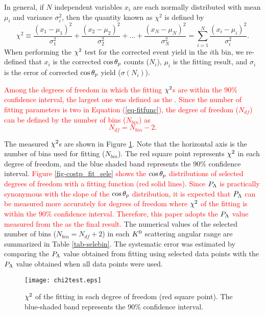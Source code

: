 In general, if $N$ independent variables $x_i$ are each normally distributed with mean $\mu_i$ and variance $\sigma_i^2$, then the quantity known as $\chi^2$ is defined by
\begin{equation}
  \chi^2 \equiv \frac{(x_1 - \mu_1)^2}{\sigma_1^2} + \frac{(x_2 - \mu_2)^2}{\sigma_2^2} + \dots + \frac{(x_N - \mu_N)^2}{\sigma_N^2} = \sum_{i=1}^N \frac{(x_i - \mu_i)^2}{\sigma_i^2}.
\end{equation}
When performing the $\chi^{2}$ test for the corrected event yield in the $i$th bin, we re-defined that $x_i$ is the corrected $\cos{\theta_p}$ counts ($N_i$), $\mu_i$ is the fitting result, and $\sigma_i$ is the error of corrected $\cos{\theta_p}$ yield ($\sigma(N_i)$). 

\textcolor{red}{ Among the degrees of freedom in which the fitting $\chi^{2}$s are within the 90\% confidence interval, the largest one was defined as the . Since the number of fitting parameters is two in Equation (\ref{eq-fitfunc}), the degree of freedom ($N_{df}$) can be defined by the number of bins ($N_{bin}$) as 
\begin{equation}
  N_{df} = N_{bin} - 2.
\end{equation} }

The measured $\chi^{2}$s are shown in Figure \ref{fig-chi2test}. Note that the horizontal axis is the number of bins used for fitting ($N_{bin}$). The red square point represents $\chi^{2}$ in each degree of freedom, and the blue shaded band represents the 90\% confidence interval. \textcolor{red}{ Figure \ref{fig-costp_fit_sele} shows the $\cos{\theta_p}$ distributions of selected degrees of freedom with a fitting function (red solid lines). 
Since $P_{\Lambda}$ is practically synonymous with the slope of the $\cos{\theta_p}$ distribution, it is expected that $P_{\Lambda}$ can be measured more accurately for degrees of freedom where $\chi^{2}$ of the fitting is within the 90\% confidence interval. Therefore, this paper adopts the $P_{\Lambda}$ value measured from the  as the final result. }
The numerical values of the selected number of bins ($N_{bin}=N_{df}+2$) in each $K^{0}$ scattering angular range are summarized in Table \ref{tab-selebin}. The systematic error was estimated by comparing the $P_{\Lambda}$ value obtained from fitting using selected data points with the $P_{\Lambda}$ value obtained when all data points were used.

\begin{figure}[!h]
  \centering
  \texttt{[image: chi2test.eps]}
  \caption{$\chi^{2}$ of the fitting in each degree of freedom (red square point). The blue-shaded band represents the 90\% confidence interval.}
  \label{fig-chi2test}
\end{figure}

